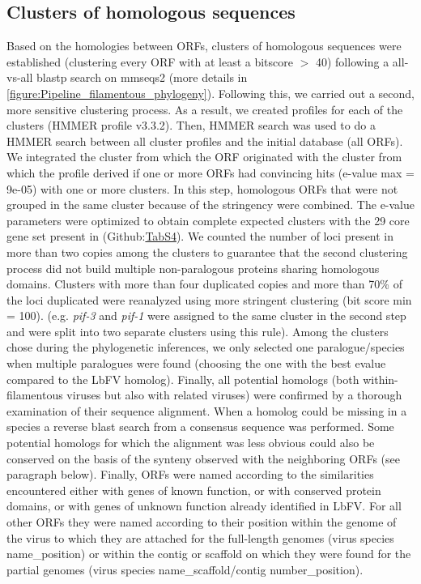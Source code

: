 \subsection{Clusters of homologous sequences} 

Based on the homologies between ORFs, clusters of homologous sequences were established (clustering every ORF with at least a bitscore $>$ 40) following a all-vs-all blastp search on mmseqs2 \citep{steinegger_mmseqs2_2017} (more details in \figurename{\ref{figure:Pipeline_filamentous_phylogeny}}). Following this, we carried out a second, more sensitive clustering process. As a result, we created profiles for each of the clusters (HMMER profile v3.3.2). Then, HMMER search was used to do a HMMER search between all cluster profiles and the initial database (all ORFs). We integrated the cluster from which the ORF originated with the cluster from which the profile derived if one or more ORFs had convincing hits (e-value max = 9e-05) with one or more clusters. In this step, homologous ORFs that were not grouped in the same cluster because of the stringency were combined. The e-value parameters were optimized to obtain complete expected clusters with the 29 core gene set present in (Github:\href{https://github.com/BenjaminGuinet/PhD_defense/blob/main/Supplementary_paper2/Table%20S4.xlsx}{TabS4}). We counted the number of loci present in more than two copies among the clusters to guarantee that the second clustering process did not build multiple non-paralogous proteins sharing homologous domains. Clusters with more than four duplicated copies and more than 70\% of the loci duplicated were reanalyzed using more stringent clustering (bit score min = 100). (e.g. \textit{pif-3} and \textit{pif-1} were assigned to the same cluster in the second step and were split into two separate clusters using this rule). Among the clusters chose during the phylogenetic inferences, we only selected one paralogue/species when multiple paralogues were found (choosing the one with the best evalue compared to the LbFV homolog). Finally, all potential homologs (both within-filamentous viruses but also with related viruses) were confirmed by a thorough examination of their sequence alignment. When a homolog could be missing in a species a reverse blast search from a consensus sequence was performed. Some potential homologs for which the alignment was less obvious could also be conserved on the basis of the synteny observed with the neighboring ORFs (see paragraph below). Finally, ORFs were named according to the similarities encountered either with genes of known function, or with conserved protein domains, or with genes of unknown function already identified in LbFV. For all other ORFs they were named according to their position within the genome of the virus to which they are attached for the full-length genomes (virus species name\_position) or within the contig or scaffold on which they were found for the partial genomes (virus species name\_scaffold/contig number\_position). 

